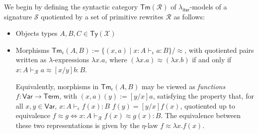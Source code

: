 \documentclass[acmsmall,screen,review]{acmart}
\newcommand{\mc}[1]{\ensuremath{\mathcal{#1}}}
\newcommand{\ms}[1]{\ensuremath{\mathsf{#1}}}
\newcommand{\hasty}[4]{#1 \vdash_{#2} #3: {#4}}
\newcommand{\teqv}{\approx}
\newcommand{\tmeq}[5]{#1 \vdash_{#2} #3 \teqv #4 : {#5}}
\newcommand{\subiterexp}{\texorpdfstring{\(\lambda_{\ms{iter}}\)}{lambda-iter}}
\begin{document}
We begin by defining the syntactic category $\ms{Tm}(\mc{R})$ of \subiterexp{}-models of a signature
$\mc{S}$ quotiented by a set of primitive rewrites $\mc{R}$ as follows:
\begin{itemize}
  \item Objects types $A, B, C \in \ms{Ty}(\mc{X})$
  \item Morphisms $\ms{Tm}_\epsilon(A, B) := \{(x, a) \mid \hasty{x : A}{\epsilon}{a}{B}\} /
  \approx$, with quotiented pairs written as $\lambda$-expressions $\lambda x . a$, where $(\lambda
  x . a) \approx (\lambda x . b)$ if and only if $\tmeq{x : A}{\mc{R}}{a}{[x/y]b}{B}$. 

  Equivalently, morphisms in $\ms{Tm}_\epsilon(A, B)$ may be viewed as \emph{functions} $f :
  \ms{Var} \to \ms{Term}$, with $(x, a)(y) := [y/x]a$, satisfying the property that, for all $x, y
  \in \ms{Var}$, $\hasty{x : A}{\epsilon}{f(x)}{B}$ $f(y) = [y/x]f(x)$, quotiented up to equivalence
  $f \approx g \iff \tmeq{x : A}{\mc{R}}{f(x)}{g(x)}{B}$. The equivalence between these two
  representations is given by the $\eta$-law $f \approx \lambda x. f(x)$.


\end{itemize}
\end{document}
